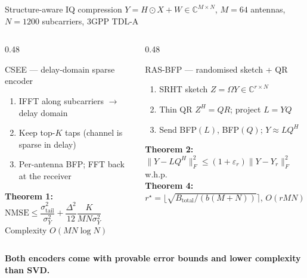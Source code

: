 \documentclass[aspectratio=169,11pt,xcolor=table]{beamer}
\newcommand{\takeaway}[1]{%
  \vfill
  \begin{alertblock}{}\centering\textbf{#1}\end{alertblock}}
\begin{document}
\begin{frame}{Structure-aware IQ compression}
  \centering
  $Y = H \odot X + W \in \mathbb{C}^{M\times N}$, \quad $M=64$ antennas, $N=1200$ subcarriers, 3GPP TDL-A
  \vspace{2mm}
  \begin{columns}[T]
    \begin{column}{0.48\textwidth}
      \begin{block}{CSEE --- delay-domain sparse encoder}
        \begin{enumerate}
          \item IFFT along subcarriers $\to$ delay domain
          \item Keep top-$K$ taps (channel is sparse in delay)
          \item Per-antenna BFP; FFT back at the receiver
        \end{enumerate}
        \textbf{Theorem 1:}
        $\mathrm{NMSE} \le \dfrac{\sigma^2_{\mathrm{tail}}}{\sigma^2_Y} + \dfrac{\Delta^2}{12}\dfrac{K}{MN\sigma_Y^2}$\\[1mm]
        Complexity $O(MN\log N)$
      \end{block}
    \end{column}
    \begin{column}{0.48\textwidth}
      \begin{exampleblock}{RAS-BFP --- randomised sketch + QR}
        \begin{enumerate}
          \item SRHT sketch $Z = \Omega Y \in \mathbb{C}^{r\times N}$
          \item Thin QR $Z^H = QR$; project $L = YQ$
          \item Send BFP$(L)$, BFP$(Q)$; \; $Y \approx LQ^H$
        \end{enumerate}
        \textbf{Theorem 2:} $\|Y - LQ^H\|_F^2 \le (1+\varepsilon_r)\|Y - Y_r\|_F^2$ w.h.p.\\
        \textbf{Theorem 4:} $r^\star = \big\lfloor \sqrt{B_{\mathrm{total}}/(b(M+N))} \big\rceil$, \; $O(rMN)$
      \end{exampleblock}
    \end{column}
  \end{columns}
  \takeaway{Both encoders come with provable error bounds and lower complexity than SVD.}
\end{frame}
\end{document}
